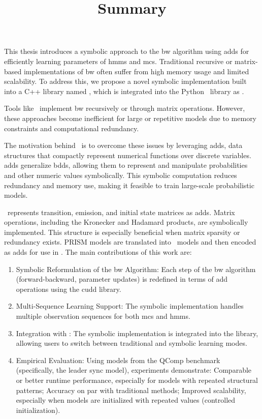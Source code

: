 \documentclass[a4paper,10pt]{article}
\title{Summary}
\date{}
\begin{document}
\maketitle
\thispagestyle{empty}
\noindent
This thesis introduces a symbolic approach to the \gls{bw} algorithm using \glspl{add} for efficiently learning parameters of \glspl{hmm} and \glspl{mc}.
Traditional recursive or matrix-based implementations of \gls{bw} often suffer from high memory usage and limited scalability.
To address this, we propose a novel symbolic implementation built into a C++ library named \Cupaal, which is integrated into the Python \Jajapy\ library as \JajapyTwo.


Tools like \Jajapy\ implement \gls{bw} recursively or through matrix operations.
However, these approaches become inefficient for large or repetitive models due to memory constraints and computational redundancy.

The motivation behind \Cupaal\ is to overcome these issues by leveraging \glspl{add}, data structures that compactly represent numerical functions over discrete variables.
\glspl{add} generalize \glspl{bdd}, allowing them to represent and manipulate probabilities and other numeric values symbolically.
This symbolic computation reduces redundancy and memory use, making it feasible to train large-scale probabilistic models.

\Cupaal\ represents transition, emission, and initial state matrices as \glspl{add}.
Matrix operations, including the Kronecker and Hadamard products, are symbolically implemented.
This structure is especially beneficial when matrix sparsity or redundancy exists.
PRISM models are translated into \Jajapy\ models and then encoded as \glspl{add} for use in \Cupaal.
The main contributions of this work are:


\begin{enumerate}
    \item Symbolic Reformulation of the \gls{bw} Algorithm: Each step of the \gls{bw} algorithm (forward-backward, parameter updates) is redefined in terms of \gls{add} operations using the \gls{cudd} library.
    \item Multi-Sequence Learning Support: The symbolic implementation handles multiple observation sequences for both \glspl{mc} and \glspl{hmm}.
    \item Integration with \Jajapy: The symbolic implementation is integrated into the \Jajapy library, allowing users to switch between traditional and symbolic learning modes.
    \item Empirical Evaluation: Using models from the QComp benchmark (specifically, the leader sync model), experiments demonstrate: Comparable or better runtime performance, especially for models with repeated structural patterns; Accuracy on par with traditional methods; Improved scalability, especially when models are initialized with repeated values (controlled initialization).
\end{enumerate}
\end{document}
